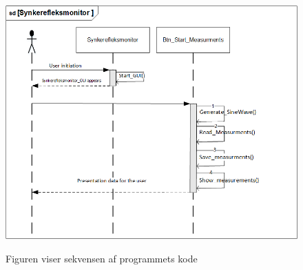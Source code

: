 \begin{figure}[H]
\centering
{\includegraphics[width=\linewidth]
{Figure/SekevensDiagram}}
\caption{Figuren viser sekvensen af programmets kode}
\label{Fig:GainOgfrequnecy}
\end{figure} 







